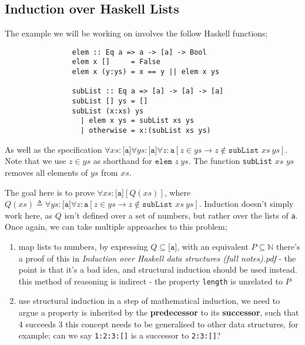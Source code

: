 \documentclass[a4paper, 12pt]{article}
\begin{document}
        \subsection*{Induction over Haskell Lists}
            The example we will be working on involves the follow Haskell functions;
            \begin{lstlisting}
                elem :: Eq a => a -> [a] -> Bool
                elem x []     = False
                elem x (y:ys) = x == y || elem x ys

                subList :: Eq a => [a] -> [a] -> [a]
                subList [] ys = []
                subList (x:xs) ys
                  | elem x ys = subList xs ys
                  | otherwise = x:(subList xs ys)
            \end{lstlisting}
            As well as the specification $\forall xs : \texttt{[a]} \forall ys : \texttt{[a]} \forall z : \texttt{a} [z \in ys \rightarrow z \not\in \texttt{subList } xs\ ys]$. Note that we use $z \in ys$ as shorthand for $\texttt{elem } z\ ys$. The function \texttt{subList} $xs$ $ys$ removes all elements of $ys$ from $xs$.
            \medskip

            The goal here is to prove $\forall xs : \texttt{[a]} [Q(xs)]$, where $Q(xs) \triangleq \forall ys : \texttt{[a]} \forall z : \texttt{a} [z \in ys \rightarrow z \not\in \texttt{subList }xs\ ys]$. Induction doesn't simply work here, as $Q$ isn't defined over a set of numbers, but rather over the lists of \texttt{a}. Once again, we can take multiple approaches to this problem;
            \begin{enumerate}[1.]
                \itemsep0em
                \item map lists to numbers, by expressing $Q \subseteq \texttt{[a]}$, with an equivalent $P \subseteq \mathbb{N}$
                    \subitem there's a proof of this in \textit{Induction over Haskell data structures (full notes).pdf} - the point is that it's a bad idea, and structural induction should be used instead.
                    \subitem this method of reasoning is indirect - the property \texttt{length} is unrelated to $P$
                \item use structural induction
                    \subitem in a step of mathematical induction, we need to argue a property is inherited by the \textbf{predecessor} to its \textbf{successor}, such that 4 succeeds 3
                    \subitem this concept needs to be generalised to other data structures, for example; can we say \texttt{1:2:3:[]} is a successor to \texttt{2:3:[]}?
            \end{enumerate}
\end{document}
